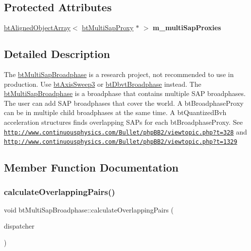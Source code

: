 \subsection*{Protected Attributes}
\begin{DoxyCompactItemize}
\item 
\mbox{\label{classbtMultiSapBroadphase_ac060350b7858cf5aa5c809e584ae430e}} 
\hyperlink{classbtAlignedObjectArray}{bt\+Aligned\+Object\+Array}$<$ \hyperlink{structbtMultiSapBroadphase_1_1btMultiSapProxy}{bt\+Multi\+Sap\+Proxy} $\ast$ $>$ {\bfseries m\+\_\+multi\+Sap\+Proxies}
\end{DoxyCompactItemize}


\subsection{Detailed Description}
The \hyperlink{classbtMultiSapBroadphase}{bt\+Multi\+Sap\+Broadphase} is a research project, not recommended to use in production. Use \hyperlink{classbtAxisSweep3}{bt\+Axis\+Sweep3} or \hyperlink{structbtDbvtBroadphase}{bt\+Dbvt\+Broadphase} instead. The \hyperlink{classbtMultiSapBroadphase}{bt\+Multi\+Sap\+Broadphase} is a broadphase that contains multiple S\+AP broadphases. The user can add S\+AP broadphases that cover the world. A bt\+Broadphase\+Proxy can be in multiple child broadphases at the same time. A bt\+Quantized\+Bvh acceleration structures finds overlapping S\+A\+Ps for each bt\+Broadphase\+Proxy. See \href{http://www.continuousphysics.com/Bullet/phpBB2/viewtopic.php?t=328}{\tt http\+://www.\+continuousphysics.\+com/\+Bullet/php\+B\+B2/viewtopic.\+php?t=328} and \href{http://www.continuousphysics.com/Bullet/phpBB2/viewtopic.php?t=1329}{\tt http\+://www.\+continuousphysics.\+com/\+Bullet/php\+B\+B2/viewtopic.\+php?t=1329} 

\subsection{Member Function Documentation}
\mbox{\label{classbtMultiSapBroadphase_a922708408ba589a5ab9b487c679ff6fb}} 
\subsubsection{\texorpdfstring{calculate\+Overlapping\+Pairs()}{calculateOverlappingPairs()}}
{\footnotesize\ttfamily void bt\+Multi\+Sap\+Broadphase\+::calculate\+Overlapping\+Pairs (\begin{DoxyParamCaption}\item[{\hyperlink{classbtDispatcher}{bt\+Dispatcher} $\ast$}]{dispatcher }\end{DoxyParamCaption})\hspace{0.3cm}{\ttfamily [virtual]}}



